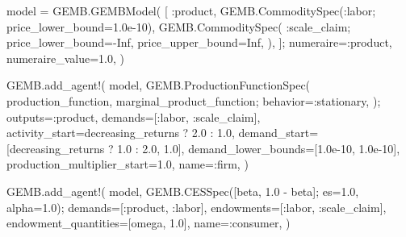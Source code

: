 \documentclass[
  letterpaper,
  DIV=11,
  numbers=noendperiod]{scrreprt}
\newenvironment{Shaded}{\begin{snugshade}}{\end{snugshade}}
\newcommand{\ConstantTok}[1]{\textcolor[rgb]{0.56,0.35,0.01}{#1}}
\newcommand{\FloatTok}[1]{\textcolor[rgb]{0.68,0.00,0.00}{#1}}
\newcommand{\FunctionTok}[1]{\textcolor[rgb]{0.28,0.35,0.67}{#1}}
\newcommand{\NormalTok}[1]{\textcolor[rgb]{0.00,0.23,0.31}{#1}}
\newcommand{\OperatorTok}[1]{\textcolor[rgb]{0.37,0.37,0.37}{#1}}
\begin{document}
\begin{codelisting}
{\begin{Shaded}
\begin{Highlighting}[]
\NormalTok{model }\OperatorTok{=}\NormalTok{ GEMB.}\FunctionTok{GEMBModel}\NormalTok{(}
\NormalTok{    [}
        \OperatorTok{:}\NormalTok{product,}
\NormalTok{        GEMB.}\FunctionTok{CommoditySpec}\NormalTok{(}\OperatorTok{:}\NormalTok{labor; price\_lower\_bound}\OperatorTok{=}\FloatTok{1.0e{-}10}\NormalTok{),}
\NormalTok{        GEMB.}\FunctionTok{CommoditySpec}\NormalTok{(}
            \OperatorTok{:}\NormalTok{scale\_claim;}
\NormalTok{            price\_lower\_bound}\OperatorTok{={-}}\ConstantTok{Inf}\NormalTok{,}
\NormalTok{            price\_upper\_bound}\OperatorTok{=}\ConstantTok{Inf}\NormalTok{,}
\NormalTok{        ),}
\NormalTok{    ];}
\NormalTok{    numeraire}\OperatorTok{=:}\NormalTok{product,}
\NormalTok{    numeraire\_value}\OperatorTok{=}\FloatTok{1.0}\NormalTok{,}
\NormalTok{)}

\NormalTok{GEMB.}\FunctionTok{add\_agent!}\NormalTok{(}
\NormalTok{    model,}
\NormalTok{    GEMB.}\FunctionTok{ProductionFunctionSpec}\NormalTok{(}
\NormalTok{        production\_function,}
\NormalTok{        marginal\_product\_function;}
\NormalTok{        behavior}\OperatorTok{=:}\NormalTok{stationary,}
\NormalTok{    );}
\NormalTok{    outputs}\OperatorTok{=:}\NormalTok{product,}
\NormalTok{    demands}\OperatorTok{=}\NormalTok{[}\OperatorTok{:}\NormalTok{labor, }\OperatorTok{:}\NormalTok{scale\_claim],}
\NormalTok{    activity\_start}\OperatorTok{=}\NormalTok{decreasing\_returns ? }\FloatTok{2.0} \OperatorTok{:} \FloatTok{1.0}\NormalTok{,}
\NormalTok{    demand\_start}\OperatorTok{=}\NormalTok{[decreasing\_returns ? }\FloatTok{1.0} \OperatorTok{:} \FloatTok{2.0}\NormalTok{, }\FloatTok{1.0}\NormalTok{],}
\NormalTok{    demand\_lower\_bounds}\OperatorTok{=}\NormalTok{[}\FloatTok{1.0e{-}10}\NormalTok{, }\FloatTok{1.0e{-}10}\NormalTok{],}
\NormalTok{    production\_multiplier\_start}\OperatorTok{=}\FloatTok{1.0}\NormalTok{,}
\NormalTok{    name}\OperatorTok{=:}\NormalTok{firm,}
\NormalTok{)}

\NormalTok{GEMB.}\FunctionTok{add\_agent!}\NormalTok{(}
\NormalTok{    model,}
\NormalTok{    GEMB.}\FunctionTok{CESSpec}\NormalTok{([beta, }\FloatTok{1.0} \OperatorTok{{-}}\NormalTok{ beta]; es}\OperatorTok{=}\FloatTok{1.0}\NormalTok{, alpha}\OperatorTok{=}\FloatTok{1.0}\NormalTok{);}
\NormalTok{    demands}\OperatorTok{=}\NormalTok{[}\OperatorTok{:}\NormalTok{product, }\OperatorTok{:}\NormalTok{labor],}
\NormalTok{    endowments}\OperatorTok{=}\NormalTok{[}\OperatorTok{:}\NormalTok{labor, }\OperatorTok{:}\NormalTok{scale\_claim],}
\NormalTok{    endowment\_quantities}\OperatorTok{=}\NormalTok{[omega, }\FloatTok{1.0}\NormalTok{],}
\NormalTok{    name}\OperatorTok{=:}\NormalTok{consumer,}
\NormalTok{)}


\end{Highlighting}
\end{Shaded}}
\end{codelisting}
\end{document}
